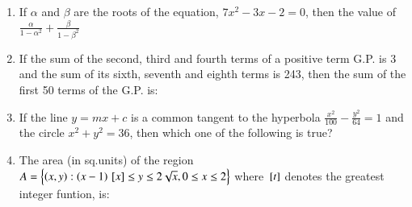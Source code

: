 \documentclass[journal,12pt,onecolumn]{IEEEtran}
\theoremstyle{remark}
\begin{document}
\begin{enumerate}
\begin{enumerate}
\begin{multicols}{4}
      \end{multicols}
      \end{enumerate}
      \item If $\alpha$ and $\beta$ are the roots of the equation, $7x^{2}-3x-2=0$, then the value of$\frac{\alpha}{1-\alpha^{2}} +\frac{\beta}{1-\beta^{2}}$
      \begin{enumerate}
      \end{enumerate}
      \item If the sum of the second, third and fourth terms of a positive term G.P. is 3 and the sum of its sixth, seventh and eighth terms is 243, then the sum of the first 50 terms of the G.P. is:
       \begin{enumerate}
      \end{enumerate}
     \item If the line $y=mx+c$ is a common tangent to the hyperbola $\frac{x^{2}}{100} - \frac{y^{2}}{64}=1$ and the circle $x^{2}+y^{2}=36$, then which one of the following is true?
      \begin{enumerate}
      \end{enumerate}
      \item The area (in sq.units) of the region $A = \left\{\left(x,y\right):\left(x-1\right) {}\left[x\right] \leq y \leq 2\sqrt{x}, 0\leq x\leq 2\right\}$ where ${}\left[t\right]$ denotes the greatest integer funtion, is:

\end{enumerate}
\end{document}

